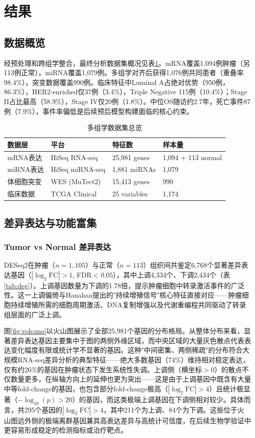 \documentclass[12pt,a4paper]{ctexart}
\begin{document}
\section{结果}

\subsection{数据概览}
经预处理和跨组学整合，最终分析数据集概况见表\ref{tab:data}。mRNA覆盖1,094例肿瘤（另113例正常），miRNA覆盖1,079例。多组学对齐后获得1,076例共同患者（重叠率98.4\%），突变数据覆盖990例。临床特征中Luminal A占绝对优势（950例，86.3\%），HER2-enriched仅37例（3.4\%），Triple Negative 115例（10.4\%）；Stage II占比最高（58.9\%），Stage IV仅20例（1.8\%）。中位OS随访约2.7年，死亡事件87例（7.9\%），事件率偏低是后续预后模型构建面临的核心约束。

\begin{table}[H]
\centering\caption{多组学数据集总览}\label{tab:data}
\begin{tabular}{llll}\toprule
数据层 & 平台 & 特征数 & 样本量 \\\midrule
mRNA表达 & HiSeq RNA-seq & 25,981 genes & 1,094 + 113 normal \\
miRNA表达 & HiSeq miRNA-seq & 1,881 miRNAs & 1,079 \\
体细胞突变 & WES (MuTect2) & 15,413 genes & 990 \\
临床数据 & TCGA Clinical & 25 variables & 1,174 \\\bottomrule
\end{tabular}
\end{table}

\subsection{差异表达与功能富集}

\subsubsection{Tumor vs Normal 差异表达}
DESeq2在肿瘤（$n=1,105$）与正常（$n=113$）组织间共鉴定6,768个显著差异表达基因（$|\log_2\text{FC}|>1$, FDR$<0.05$），其中上调4,334个、下调2,434个（表\ref{tab:deg}）。上调基因数量为下调的1.78倍，提示肿瘤细胞中转录激活事件的广泛性。这一上调偏倚与Hanahan\cite{hanahan2011hallmarks}提出的"持续增殖信号"核心特征直接对应——肿瘤细胞持续增殖所需的细胞周期激活、DNA复制增强以及代谢重编程共同驱动了转录组层面的广泛上调。

图\ref{fig:volcano}以火山图展示了全部25,981个基因的分布格局。从整体分布来看，显著差异表达基因主要集中于图的两侧外缘区域，而中央区域的大量灰色散点代表表达变化幅度有限或统计学不显著的基因。这种"中间密集、两侧稀疏"的分布符合大规模RNA-seq差异分析的典型特征——绝大多数基因（74\%）维持相对稳定表达，仅有约26\%的基因在肿瘤状态下发生系统性失调。上调侧（横坐标$>$0）的散点不仅数量更多，在纵轴方向上的延伸也更为突出——这是由于上调基因中既含有大量中等fold-change的基因，也包含部分fold-change极高（$|\log_2\text{FC}|>4$）且统计极显著（$-\log_{10}(p)>20$）的基因，而这类极端上调基因在下调侧相对较少。具体而言，共295个基因的$|\log_2\text{FC}|>4$，其中211个为上调、84个为下调。这些位于火山图远外侧的极端离群基因兼具高表达差异与高统计可信度，在后续生物学验证中更容易形成稳定的检测指标或治疗靶点。
\end{document}

